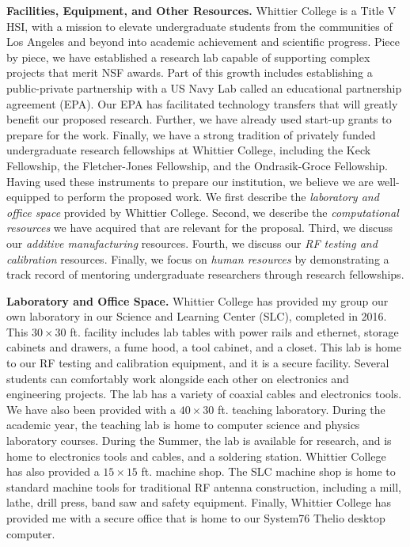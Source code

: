 \documentclass[../../main.tex]{subfiles}
\begin{document}
\label{sec:fac_equip_res}

\textbf{Facilities, Equipment, and Other Resources.}  Whittier College is a Title V HSI, with a mission to elevate undergraduate students from the communities of Los Angeles and beyond into academic achievement and scientific progress.  Piece by piece, we have established a research lab capable of supporting complex projects that merit NSF awards.  Part of this growth includes establishing a public-private partnership with a US Navy Lab called an educational partnership agreement (EPA).  Our EPA has facilitated technology transfers that will greatly benefit our proposed research.  Further, we have already used start-up grants to prepare for the work.  Finally, we have a strong tradition of privately funded undergraduate research fellowships at Whittier College, including the Keck Fellowship, the Fletcher-Jones Fellowship, and the Ondrasik-Groce Fellowship.  Having used these instruments to prepare our institution, we believe we are well-equipped to perform the proposed work.  We first describe the \textit{laboratory and office space} provided by Whittier College.  Second, we describe the \textit{computational resources} we have acquired that are relevant for the proposal.  Third, we discuss our \textit{additive manufacturing} resources.  Fourth, we discuss our \textit{RF testing and calibration} resources.  Finally, we focus on \textit{human resources} by demonstrating a track record of mentoring undergraduate researchers through research fellowships. \\ \vspace{2.5mm}

\textbf{Laboratory and Office Space.} Whittier College has provided my group our own laboratory in our Science and Learning Center (SLC), completed in 2016.  This $30 \times 30$ ft. facility includes lab tables with power rails and ethernet, storage cabinets and drawers, a fume hood, a tool cabinet, and a closet.  This lab is home to our RF testing and calibration equipment, and it is a secure facility.  Several students can comfortably work alongside each other on electronics and engineering projects.  The lab has a variety of coaxial cables and electronics tools.  We have also been provided with a $40 \times 30$ ft. teaching laboratory.  During the academic year, the teaching lab is home to computer science and physics laboratory courses.  During the Summer, the lab is available for research, and is home to electronics tools and cables, and a soldering station.  Whittier College has also provided a $15 \times 15$ ft. machine shop.  The SLC machine shop is home to standard machine tools for traditional RF antenna construction, including a mill, lathe, drill press, band saw and safety equipment.  Finally, Whittier College has provided me with a secure office that is home to our System76 Thelio desktop computer. \\ \vspace{2.5mm}
\end{document}

